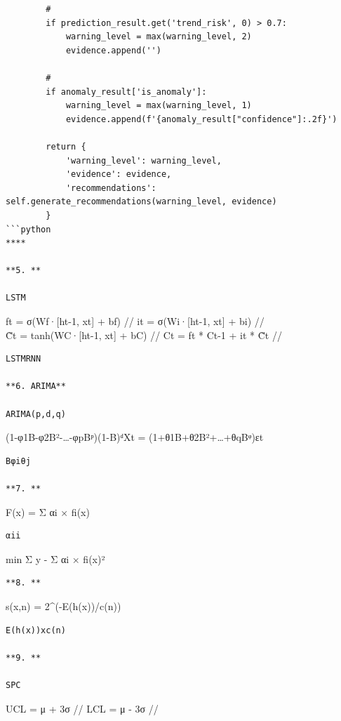 \begin{verbatim}
        #   
        if prediction_result.get('trend_risk', 0) > 0.7:
            warning_level = max(warning_level, 2)
            evidence.append('')
            
        # 
        if anomaly_result['is_anomaly']:
            warning_level = max(warning_level, 1)
            evidence.append(f'{anomaly_result["confidence"]:.2f}')
        
        return {
            'warning_level': warning_level,
            'evidence': evidence,
            'recommendations': self.generate_recommendations(warning_level, evidence)
        }
```python
****

**5. **

LSTM
\end{verbatim}

ft = σ(Wf·{[}ht-1, xt{]} + bf) // it = σ(Wi·{[}ht-1, xt{]} + bi) //\\
C̃t = tanh(WC·{[}ht-1, xt{]} + bC) // Ct = ft * Ct-1 + it * C̃t //

\begin{verbatim}
LSTMRNN

**6. ARIMA**

ARIMA(p,d,q)
\end{verbatim}

(1-φ1B-φ2B²-\ldots-φpBᵖ)(1-B)ᵈXt = (1+θ1B+θ2B²+\ldots+θqBᵠ)εt

\begin{verbatim}
Bφiθj

**7. **
\end{verbatim}

F(x) = Σ αi × fi(x)

\begin{verbatim}
αii
\end{verbatim}

min Σ \textbar\textbar y - Σ αi × fi(x)\textbar\textbar²

\begin{verbatim}
**8. **
\end{verbatim}

s(x,n) = 2\^{}(-E(h(x))/c(n))

\begin{verbatim}
E(h(x))xc(n)

**9. **

SPC
\end{verbatim}

UCL = μ + 3σ // LCL = μ - 3σ //

